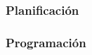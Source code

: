\documentclass[../../../main.tex]{subfiles}
\begin{document}
\subsubsection{Planificación}\label{subsubsec:planificacion}


\subsubsection{Programación}\label{subsubsec:programacion}

\end{document}

